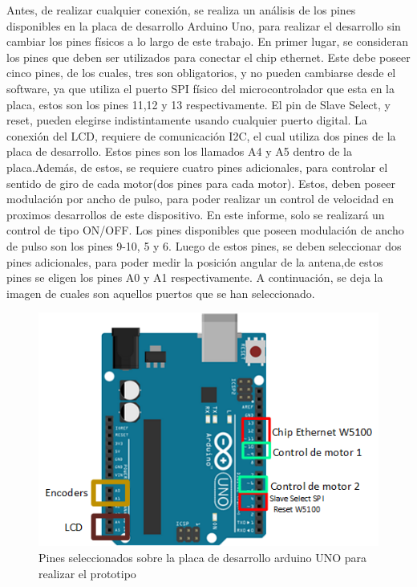 Antes, de realizar cualquier conexión, se realiza un análisis de los pines disponibles en la placa de desarrollo Arduino Uno, para realizar el desarrollo sin cambiar los pines físicos a lo largo de este trabajo. En primer lugar, se consideran los pines que deben ser utilizados para conectar el chip ethernet. Este debe poseer cinco pines, de los cuales, tres son obligatorios, y no pueden cambiarse desde el software, ya que utiliza el puerto SPI físico del microcontrolador que esta en la placa, estos son los pines 11,12 y 13 respectivamente. El pin de Slave Select, y reset, pueden elegirse indistintamente usando cualquier puerto digital. La conexión del LCD, requiere de comunicación I2C, el cual utiliza dos pines de la placa de desarrollo. Estos pines son los llamados A4 y A5 dentro de la placa.Además, de estos, se requiere cuatro pines adicionales, para controlar el sentido de giro de cada motor(dos pines para cada motor). Estos, deben poseer modulación por ancho de pulso, para poder realizar un control de velocidad en proximos desarrollos de este dispositivo. En este informe, solo se realizará un control de tipo ON/OFF. Los pines disponibles que poseen modulación de ancho de pulso son los pines 9-10, 5 y 6. Luego de estos pines, se deben seleccionar dos pines adicionales, para poder medir la posición angular de la antena,de estos pines se eligen los pines A0 y A1 respectivamente. A continuación, se deja la imagen de cuales son aquellos puertos que se han seleccionado.   

\begin{figure}[H]
	\centering
	\includegraphics{pines_ard_uno}
	\caption{Pines seleccionados sobre la placa de desarrollo arduino UNO para realizar el prototipo}
	\label{fig:pin_select_ard_uno}
\end{figure}


